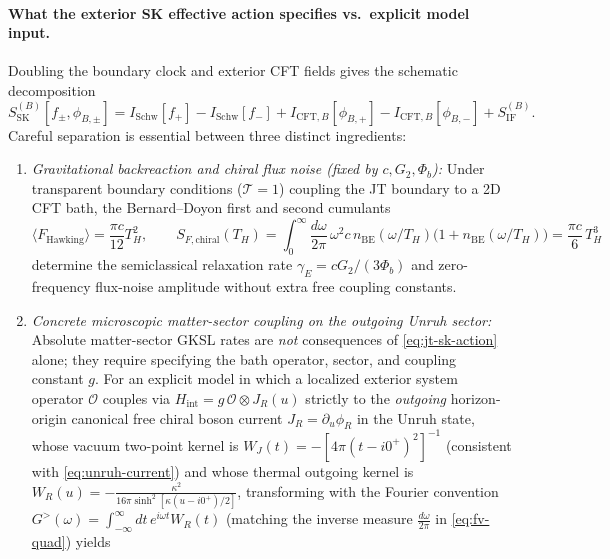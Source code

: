 \documentclass[11pt,a4paper]{article}
\theoremstyle{definition}
\theoremstyle{remark}
\newcommand{\cT}{\mathcal{T}}
\newcommand{\1}{\mathbf{1}}
\begin{document}
\paragraph{What the exterior SK effective action specifies vs.\ explicit model input.}
Doubling the boundary clock and exterior CFT fields gives the schematic decomposition
\begin{equation}\label{eq:jt-sk-action}
  S_{\mathrm{SK}}^{(B)}[f_\pm, \phi_{B,\pm}] = I_{\mathrm{Schw}}[f_+] - I_{\mathrm{Schw}}[f_-] + I_{\mathrm{CFT},B}[\phi_{B,+}] - I_{\mathrm{CFT},B}[\phi_{B,-}] + S_{\mathrm{IF}}^{(B)}.
\end{equation}
Careful separation is essential between three distinct ingredients:
\begin{enumerate}
  \item \emph{Gravitational backreaction and chiral flux noise (fixed by $c, G_2, \Phi_b$):} Under transparent boundary conditions ($\cT=1$) coupling the JT boundary to a 2D CFT bath, the Bernard--Doyon first and second cumulants \cite{BernardDoyon2012,BernardDoyon2015}
  \begin{equation}\label{eq:chiral-noise}
    \langle F_{\mathrm{Hawking}}\rangle = \frac{\pi c}{12}T_H^2, \qquad
    S_{F,\mathrm{chiral}}(T_H)
    = \int_0^\infty\!\frac{d\omega}{2\pi}\,\omega^2 c\,n_{\mathrm{BE}}(\omega/T_H)\bigl(1 + n_{\mathrm{BE}}(\omega/T_H)\bigr)
    = \frac{\pi c}{6}\,T_H^3
  \end{equation}
  determine the semiclassical relaxation rate $\gamma_E = cG_2/(3\Phi_b)$ \cite{Mertens2019} and zero-frequency flux-noise amplitude without extra free coupling constants.
  \item \emph{Concrete microscopic matter-sector coupling on the outgoing Unruh sector:} Absolute matter-sector GKSL rates are \emph{not} consequences of \eqref{eq:jt-sk-action} alone; they require specifying the bath operator, sector, and coupling constant $g$. For an explicit model in which a localized exterior system operator $\mathcal{O}$ couples via $H_{\mathrm{int}} = g\,\mathcal{O}\otimes J_R(u)$ strictly to the \emph{outgoing} horizon-origin canonical free chiral boson current $J_R = \partial_u\phi_R$ in the Unruh state, whose vacuum two-point kernel is $W_J(t) = -[4\pi(t-i0^+) ^2]^{-1}$ (consistent with \eqref{eq:unruh-current}) and whose thermal outgoing kernel is $W_R(u) = -\frac{\kappa^2}{16\pi\sinh^2[\kappa(u-i0^+)/2]}$, transforming with the Fourier convention $G^>(\omega) = \int_{-\infty}^\infty dt\,e^{i\omega t}W_R(t)$ (matching the inverse measure $\frac{d\omega}{2\pi}$ in \eqref{eq:fv-quad}) yields \cite{JuarezAubryLouko2014}

\end{enumerate}
\end{document}
